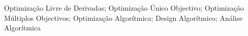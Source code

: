 \noindent Optimização Livre de Derivadas; Optimização Único Objectivo; Optimização Múltiplos Objectivos; Optimização Algorítmica; Design Algorítmico; Análise Algorítmica
